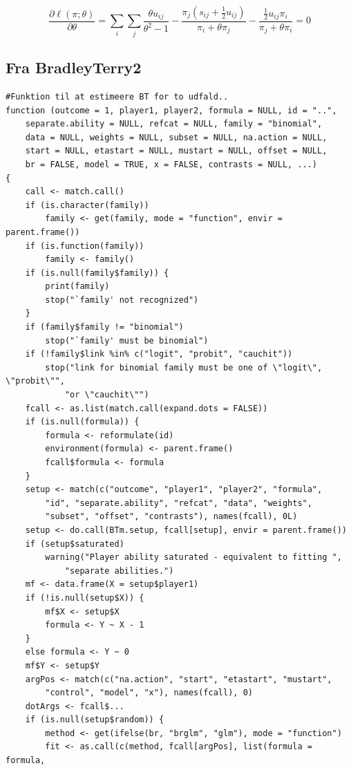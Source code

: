 \documentclass[11pt,a4paper]{article}
\begin{document}
\begin{equation}
\frac{\partial \ell(\pi;\theta)}{\partial \theta}=\sum_i\sum_j
\frac{\theta u_{ij}}{\theta^2-1}
- \frac{\pi_j(s_{ij}+\frac{1}{2}u_{ij})}{\pi_i+\theta \pi_j}
- \frac{\frac{1}{2}u_{ij}\pi_i}{\pi_j+\theta \pi_i}=0
\end{equation}

\newpage
\subsection{Fra BradleyTerry2}
\begin{lstlisting}
#Funktion til at estimeere BT for to udfald..
function (outcome = 1, player1, player2, formula = NULL, id = "..", 
    separate.ability = NULL, refcat = NULL, family = "binomial", 
    data = NULL, weights = NULL, subset = NULL, na.action = NULL, 
    start = NULL, etastart = NULL, mustart = NULL, offset = NULL, 
    br = FALSE, model = TRUE, x = FALSE, contrasts = NULL, ...) 
{
    call <- match.call()
    if (is.character(family)) 
        family <- get(family, mode = "function", envir = parent.frame())
    if (is.function(family)) 
        family <- family()
    if (is.null(family$family)) {
        print(family)
        stop("`family' not recognized")
    }
    if (family$family != "binomial") 
        stop("`family' must be binomial")
    if (!family$link %in% c("logit", "probit", "cauchit")) 
        stop("link for binomial family must be one of \"logit\", \"probit\"", 
            "or \"cauchit\"")
    fcall <- as.list(match.call(expand.dots = FALSE))
    if (is.null(formula)) {
        formula <- reformulate(id)
        environment(formula) <- parent.frame()
        fcall$formula <- formula
    }
    setup <- match(c("outcome", "player1", "player2", "formula", 
        "id", "separate.ability", "refcat", "data", "weights", 
        "subset", "offset", "contrasts"), names(fcall), 0L)
    setup <- do.call(BTm.setup, fcall[setup], envir = parent.frame())
    if (setup$saturated) 
        warning("Player ability saturated - equivalent to fitting ", 
            "separate abilities.")
    mf <- data.frame(X = setup$player1)
    if (!is.null(setup$X)) {
        mf$X <- setup$X
        formula <- Y ~ X - 1
    }
    else formula <- Y ~ 0
    mf$Y <- setup$Y
    argPos <- match(c("na.action", "start", "etastart", "mustart", 
        "control", "model", "x"), names(fcall), 0)
    dotArgs <- fcall$...
    if (is.null(setup$random)) {
        method <- get(ifelse(br, "brglm", "glm"), mode = "function")
        fit <- as.call(c(method, fcall[argPos], list(formula = formula, 

\end{lstlisting}
\end{document}

